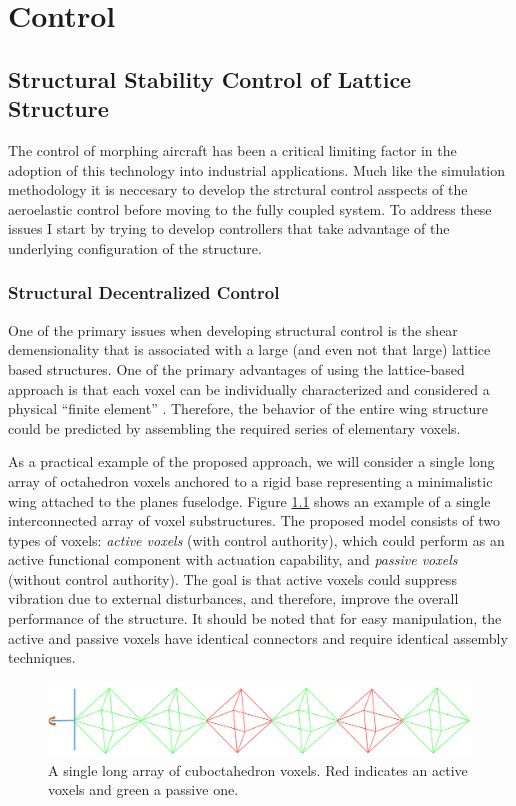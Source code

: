 \documentclass[11pt]{ucthesis}
\begin{document}
\chapter{Control}
\section{Structural Stability Control of Lattice Structure}
The control of morphing aircraft has been a critical limiting factor in the adoption of this technology into industrial applications. Much like the simulation methodology it is neccesary to develop the strctural control asspects of the aeroelastic control before moving to the fully coupled system. To address these issues I start by trying to develop controllers that take advantage of the underlying configuration of the structure.

\subsection{Structural Decentralized Control}
\label{sec:decentral}
One of the primary issues when developing structural control is the shear demensionality that is associated with a large (and even not that large) lattice based structures. One of the primary advantages of using the lattice-based approach is that each voxel can be individually characterized and considered a physical ``finite element'' \cite{calisch2014physical}. Therefore, the behavior of the entire wing structure could be predicted by assembling the required series of elementary voxels. 

As a practical example of the proposed approach, we will consider a single long array of octahedron voxels anchored to a rigid base representing a minimalistic wing attached to the planes fuselodge. Figure \ref{fig:interconnected} shows an example of a single interconnected array of voxel substructures. The proposed model consists of two types of voxels: {\it active voxels} (with control authority), which could perform as an active functional component with actuation capability,  and {\it passive voxels} (without control authority). The goal is that active voxels could suppress vibration due to external disturbances, and therefore, improve the overall performance of the structure. It should be noted that for easy manipulation, the active and passive voxels have identical connectors and require identical assembly techniques.  

\begin{figure}[h]
\centering
\includegraphics[width=0.75\linewidth]{Figures/exampleInterconnectedStructure.png}
\caption{A single long array of cuboctahedron voxels. Red indicates an active voxels and green a passive one.}
\label{fig:interconnected}
\end{figure}
\end{document}
